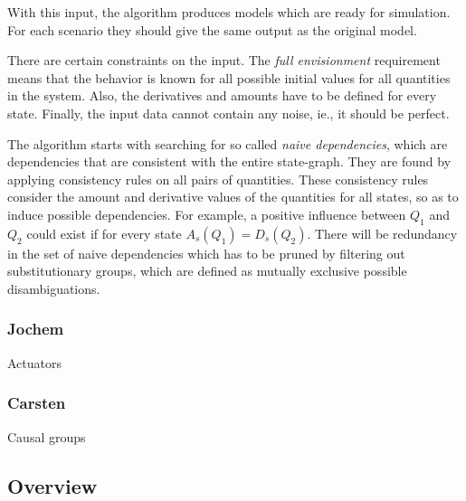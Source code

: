 \documentclass{article} %
\begin{document}
With this input, the algorithm produces models which are ready for simulation.
For each scenario they should give the same output as the original model.

There are certain constraints on the input. The \emph{full envisionment}
requirement means that the behavior is known for all possible initial values
for all quantities in the system. Also, the derivatives and amounts have to be
defined for every state. Finally, the input data cannot contain any noise,
ie., it should be perfect.

The algorithm starts with searching for so called \emph{naive dependencies},
which are dependencies that are consistent with the entire state-graph. They
are found by applying consistency rules on all pairs of quantities. These
consistency rules consider the amount and derivative values of the quantities
for all states, so as to induce possible dependencies. For example, a positive
influence between $Q_1$ and $Q_2$ could exist if for every state $A_s(Q_1) =
D_s(Q_2)$.  There will be redundancy in the set of naive dependencies which
has to be pruned by filtering out substitutionary groups, which are defined as
mutually exclusive possible disambiguations. 


\subsubsection{Jochem}

Actuators



\subsubsection{Carsten}


Causal groups %

\subsection{Overview}



\newpage
\end{document}
